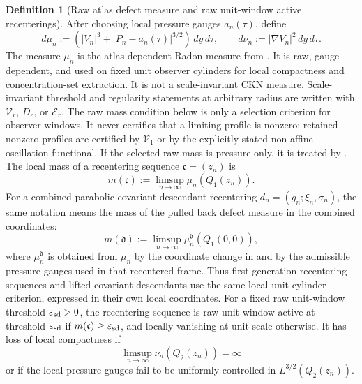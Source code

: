 \documentclass[11pt]{amsart}
\numberwithin{equation}{section}
\theoremstyle{plain}
\theoremstyle{definition}
\newtheorem{definition}[definition]{Definition}
\theoremstyle{remark}
\newcommand{\eps}{\varepsilon}
\newcommand{\calE}{\mathcal E}
\newcommand{\Vel}{\mathcal V}
\begin{document}
\begin{definition}[Raw atlas defect measure and raw unit-window active recenterings]
\label{def:terminal-measures}
After choosing local pressure gauges \(a_n(\tau)\), define
\[
   d\mu_n
   :=
   \left(|V_n|^3+|P_n-a_n(\tau)|^{3/2}\right)\,dy\,d\tau,
   \qquad
   d\nu_n:=|\nabla V_n|^2\,dy\,d\tau .
\]
The measure \(\mu_n\) is the atlas-dependent Radon measure from
.  It is raw, gauge-dependent, and used on
fixed unit observer cylinders for local compactness and concentration-set
extraction.  It is not a scale-invariant CKN measure.  Scale-invariant
threshold and regularity statements at arbitrary radius are written with
\(\Vel_r\), \(D_r\), or \(\calE_r\).
The raw mass condition below is only a selection criterion for observer
windows.  It never certifies that a limiting profile is nonzero: retained
nonzero profiles are certified by \(\Vel_1\) or by the explicitly stated
non-affine oscillation functional.  If the selected raw mass is pressure-only,
it is treated by .
The local mass of a recentering sequence \(\mathfrak c=(z_n)\) is
\[
   m(\mathfrak c):=\limsup_{n\to\infty}\mu_n(Q_1(z_n)).
\]
For a combined parabolic-covariant descendant recentering
\(d_n=(g_n;\xi_n,\sigma_n)\), the same notation means the mass of the pulled
back defect measure in the combined coordinates:
\[
   m(\mathfrak d):=
   \limsup_{n\to\infty}\mu_n^{\mathfrak d}(Q_1(0,0)),
\]
where \(\mu_n^{\mathfrak d}\) is obtained from \(\mu_n\) by the coordinate
change in  and by the admissible
pressure gauges used in that recentered frame.  Thus first-generation
recentering sequences and lifted covariant descendants use the same local
unit-cylinder criterion, expressed in their own local coordinates.
For a fixed raw unit-window threshold \(\eps_{\rm sd}>0\), the recentering sequence
is raw unit-window active at threshold \(\eps_{\rm sd}\) if
\(m(\mathfrak c)\ge\eps_{\rm sd}\), and locally vanishing at unit scale
otherwise.  It has loss of local compactness if
\[
   \limsup_{n\to\infty}\nu_n(Q_2(z_n))=\infty
\]
or if the local pressure gauges fail to be uniformly controlled in
\(L^{3/2}(Q_2(z_n))\).
\end{definition}
\end{document}
